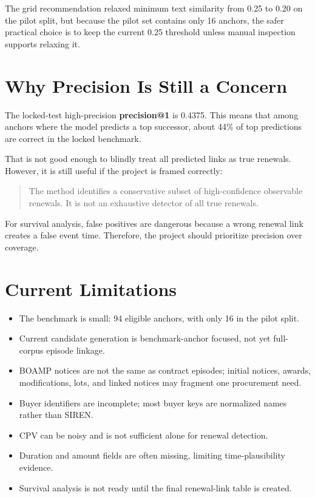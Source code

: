 \documentclass[11pt,a4paper]{article}
\newcommand{\metric}[1]{\textbf{#1}}
\begin{document}
The grid recommendation relaxed minimum text similarity from 0.25 to 0.20 on the pilot split, but because the pilot set contains only 16 anchors, the safer practical choice is to keep the current 0.25 threshold unless manual inspection supports relaxing it.

\section*{Why Precision Is Still a Concern}

The locked-test high-precision \metric{precision@1} is 0.4375. This means that among anchors where the model predicts a top successor, about 44\% of top predictions are correct in the locked benchmark.

That is not good enough to blindly treat all predicted links as true renewals. However, it is still useful if the project is framed correctly:

\begin{quote}
The method identifies a conservative subset of high-confidence observable renewals. It is not an exhaustive detector of all true renewals.
\end{quote}

For survival analysis, false positives are dangerous because a wrong renewal link creates a false event time. Therefore, the project should prioritize precision over coverage.

\section*{Current Limitations}

\begin{itemize}
  \item The benchmark is small: 94 eligible anchors, with only 16 in the pilot split.
  \item Current candidate generation is benchmark-anchor focused, not yet full-corpus episode linkage.
  \item BOAMP notices are not the same as contract episodes; initial notices, awards, modifications, lots, and linked notices may fragment one procurement need.
  \item Buyer identifiers are incomplete; most buyer keys are normalized names rather than SIREN.
  \item CPV can be noisy and is not sufficient alone for renewal detection.
  \item Duration and amount fields are often missing, limiting time-plausibility evidence.
  \item Survival analysis is not ready until the final renewal-link table is created.
\end{itemize}
\end{document}
